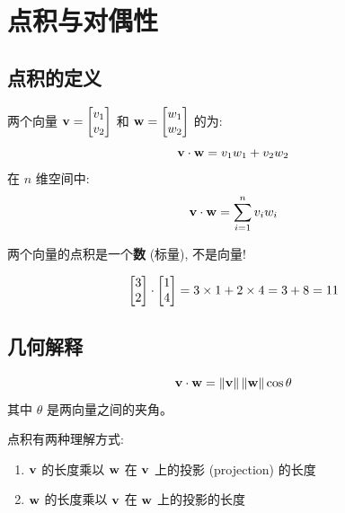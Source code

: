 
\chapter{点积与对偶性}
\label{ch:dotproduct}

\begin{abstract}
点积 (dot product) 是线性代数中最基本的运算之一。在本章中, 我们将学习它的定义、性质, 以及把向量与线性函数联系起来的深刻概念---对偶性。
\end{abstract}

\section{点积的定义}

\begin{definition}[点积]
两个向量 $\mathbf{v} = \begin{bmatrix} v_1 \\ v_2 \end{bmatrix}$ 和 $\mathbf{w} = \begin{bmatrix} w_1 \\ w_2 \end{bmatrix}$ 的为:
\[
\mathbf{v} \cdot \mathbf{w} = v_1 w_1 + v_2 w_2
\]
在 $n$ 维空间中:
\[
\mathbf{v} \cdot \mathbf{w} = \sum_{i=1}^{n} v_i w_i
\]
\end{definition}

\begin{important}
两个向量的点积是一个\textbf{数} (标量), 不是向量!
\end{important}

\begin{example}
\[
\begin{bmatrix} 3 \\ 2 \end{bmatrix} \cdot \begin{bmatrix} 1 \\ 4 \end{bmatrix} = 3 \times 1 + 2 \times 4 = 3 + 8 = 11
\]
\end{example}

\section{几何解释}

\begin{theorem}[点积的几何公式]
\[
\mathbf{v} \cdot \mathbf{w} = \left\| \mathbf{v} \right\| \left\| \mathbf{w} \right\| \cos\theta
\]
其中 $\theta$ 是两向量之间的夹角。
\end{theorem}

\begin{intuition}
点积有两种理解方式:
\begin{enumerate}
    \item $\mathbf{v}$ 的长度乘以 $\mathbf{w}$ 在 $\mathbf{v}$ 上的投影 (projection) 的长度
    \item $\mathbf{w}$ 的长度乘以 $\mathbf{v}$ 在 $\mathbf{w}$ 上的投影的长度
\end{enumerate}
\end{intuition}

